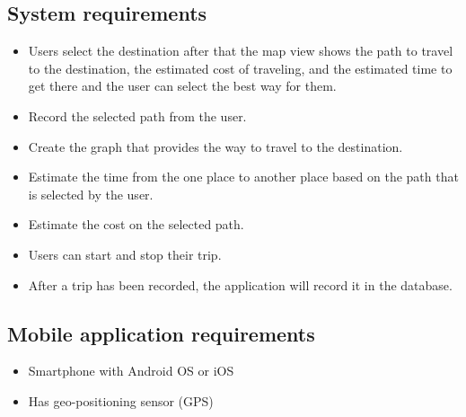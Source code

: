 \subsection{System requirements}
\begin{itemize}
	\item Users select the destination after that the map view shows the path to travel to the destination, the estimated cost of traveling, and the estimated time to get there and the user can select the best way for them.
	\item Record the selected path from the user.
	\item Create the graph that provides the way to travel to the destination.
	\item Estimate the time from the one place to another place based on the path that is selected by the user.
	\item Estimate the cost on the selected path.
	\item Users can start and stop their trip.
	\item After a trip has been recorded, the application will record it in the database.
\end{itemize}

\subsection{Mobile application requirements}
\begin{itemize}
	\item Smartphone with Android OS or iOS
	\item Has geo-positioning sensor (GPS)
\end{itemize}

